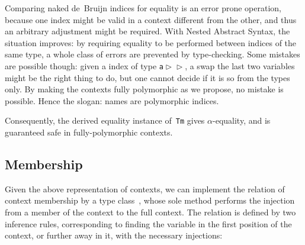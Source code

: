 \documentclass[9pt,preprint,authoryear]{sigplanconf}
\begin{document}
%
    Comparing naked de{~}Bruijn indices for equality is an error prone operation, 
    because one index might be valid in
    a context different from the other, and thus an arbitrary adjustment might be required.
    With Nested Abstract Syntax, the situation improves{:} by requiring equality to be 
    performed between indices of the same type, a whole class of errors are prevented by
    type-checking. Some mistakes are possible though{:} given a index of type \textcolor[rgb]{0,0,0.80}{\texttt{a}}\textcolor[rgb]{0,0,0.80}{\texttt{\mbox{\hspace{0.50em}}}}\textcolor[rgb]{0,0,0.80}{\texttt{$ \vartriangleright $}}\textcolor[rgb]{0,0,0.80}{\texttt{\mbox{\hspace{0.50em}}}}\textcolor[cmyk]{0,0.65,0.99,0}{\texttt{\makebox[1.22ex][l]{$ {(} $}}}\textcolor[cmyk]{0,0.65,0.99,0}{\texttt{\makebox[1.22ex][r]{$ {)} $}}}\textcolor[rgb]{0,0,0.80}{\texttt{\mbox{\hspace{0.50em}}}}\textcolor[rgb]{0,0,0.80}{\texttt{$ \vartriangleright $}}\textcolor[rgb]{0,0,0.80}{\texttt{\mbox{\hspace{0.50em}}}}\textcolor[cmyk]{0,0.65,0.99,0}{\texttt{\makebox[1.22ex][l]{$ {(} $}}}\textcolor[cmyk]{0,0.65,0.99,0}{\texttt{\makebox[1.22ex][r]{$ {)} $}}},
    a swap the last two variables might be the right thing to do, but one cannot decide if it is so 
    from the types only.
    By making the contexts fully
    polymorphic as we propose, no mistake is possible. 
    Hence the slogan{:} names are polymorphic indices.%


%
Consequently, the derived equality instance of{~}\textcolor[rgb]{0,0,0.80}{\texttt{Tm}} gives
    $ \alpha $-equality, and is guaranteed safe in fully-polymorphic contexts.%


\subsection{Membership}

%
Given the above representation of contexts, we can implement
    the relation of context membership by a type class{~}\textcolor[rgb]{0,0,0.80}{\texttt{\makebox[1.22ex][c]{$ \in $}}}, whose
    sole method performs the injection from a member of the context to
    the full context. The relation is defined by two inference rules,
    corresponding to finding the variable in the first position of the
    context, or further away in it, with the necessary injections{:}%
\end{document}
